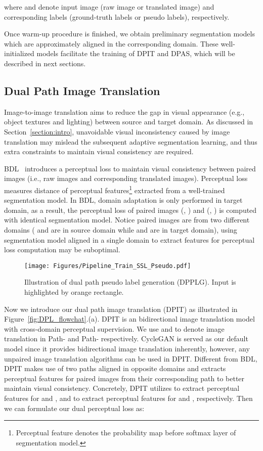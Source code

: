 \documentclass[10pt,twocolumn,letterpaper]{article}
\begin{document}
 where  and  denote input image (raw image or translated image) and corresponding labels (ground-truth labels or pseudo labels), respectively.
 
Once warm-up procedure is finished, we obtain preliminary segmentation models which are approximately aligned in the corresponding domain. These well-initialized models facilitate the training of DPIT and DPAS, which will be described in next sections.

\subsection{Dual Path Image Translation\label{section:DPIT}}
  Image-to-image translation aims to reduce the gap in visual appearance (e.g., object textures and lighting) between source and target domain. As discussed in Section~\ref{section:intro}, unavoidable visual inconsistency caused by image translation may mislead the subsequent adaptive segmentation learning, and thus extra constraints to maintain visual consistency are required. 
  
  BDL~\cite{li2019bidirectional} introduces a perceptual loss to maintain visual consistency between paired images (i.e., raw images and corresponding translated images). Perceptual loss measures distance of perceptual features\footnote{Perceptual feature denotes the probability map before softmax layer of segmentation model.} extracted from a well-trained segmentation model. In BDL, domain adaptation is only performed in target domain, as a result, the perceptual loss of paired images (, ) and (, ) is computed with identical segmentation model. Notice paired images are from two different domains ( and  are in source domain while  and  are in target domain), using segmentation model aligned in a single domain to extract features for perceptual loss computation may be suboptimal. 
  
 \begin{figure}[t]
  \centering
  \texttt{[image: Figures/Pipeline\_Train\_SSL\_Pseudo.pdf]}
\caption{Illustration of dual path pseudo label generation (DPPLG). Input is highlighted by orange rectangle.}
  \label{fig:DPPLG}
  \vspace{-4mm}
\end{figure}

Now we introduce our dual path image translation (DPIT) as illustrated in Figure~\ref{fig:DPL_flowchat}.(a). DPIT is an bidirectional image translation model with cross-domain perceptual supervision. We use  and  to denote image translation in Path- and Path- respectively. CycleGAN is served as our default model since it provides bidirectional image translation inherently, however, any unpaired image translation algorithms can be used in DPIT. Different from BDL, DPIT makes use of two paths aligned in opposite domains and extracts perceptual features for paired images from their corresponding path to better maintain visual consistency. Concretely, DPIT utilizes  to extract perceptual features for  and , and  to extract perceptual features for  and , respectively. Then we can formulate our dual perceptual loss  as:
\end{document}
